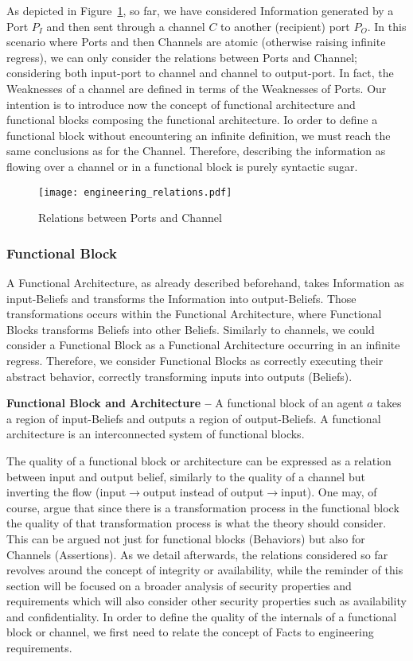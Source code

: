 As depicted in Figure~\ref{fig:atom}, so far, we have considered Information
generated by a Port $P_I$ and then sent through a channel $C$ to another
(recipient) port $P_O$. In this scenario where Ports and then Channels are
atomic (otherwise raising infinite regress), we can only  consider the
relations between Ports and Channel; considering both input-port to channel and
channel to output-port. In fact, the Weaknesses of a channel are defined in terms
of the Weaknesses of Ports. Our intention is to introduce now the concept of
functional architecture and functional blocks composing the functional architecture.
Io order to define a functional block without encountering an infinite definition,
we must reach the same conclusions as for the Channel. Therefore, describing
the information as flowing over a channel or in a functional block is purely
syntactic sugar.

\begin{figure}[t]
	\centering
	\texttt{[image: engineering\_relations.pdf]}
	\caption{Relations between Ports and Channel}
	\label{fig:atom}
\end{figure}

\subsubsection{Functional Block}
A Functional Architecture, as already described beforehand, takes Information as input-Beliefs
and transforms the Information into output-Beliefs. Those transformations 
occurs within the Functional Architecture, where Functional Blocks transforms Beliefs into 
other Beliefs. Similarly to channels, we could consider a Functional Block as a Functional Architecture
occurring in an infinite regress. Therefore, we consider Functional Blocks as 
correctly executing their abstract behavior, correctly transforming inputs into outputs (Beliefs).

\begin{definition}{\bf Functional Block and Architecture --}\label{def:funblock}
	A functional block of an agent $a$ 
	takes a region of input-Beliefs and outputs a region of output-Beliefs. 
	A functional architecture is an interconnected system of functional blocks.
\end{definition}
The quality of a functional block or architecture can be expressed as a
relation between input and output belief, similarly to the quality of a channel
but inverting the flow (input$\rightarrow$output instead of
output$\rightarrow$input).  One may, of course, argue that since there is a
transformation process in the functional block the quality of that
transformation process is what the theory should consider. This can
be argued not just for functional blocks (Behaviors) but also for Channels
(Assertions). As we detail afterwards, the relations considered so
far revolves around the concept of integrity or availability, while the reminder of this section 
will be focused on a broader analysis of security properties and requirements
which will also consider other security properties such as availability and
confidentiality.  In order to define the quality of the internals of a functional block or channel, we first
need to relate the concept of Facts to engineering requirements.

